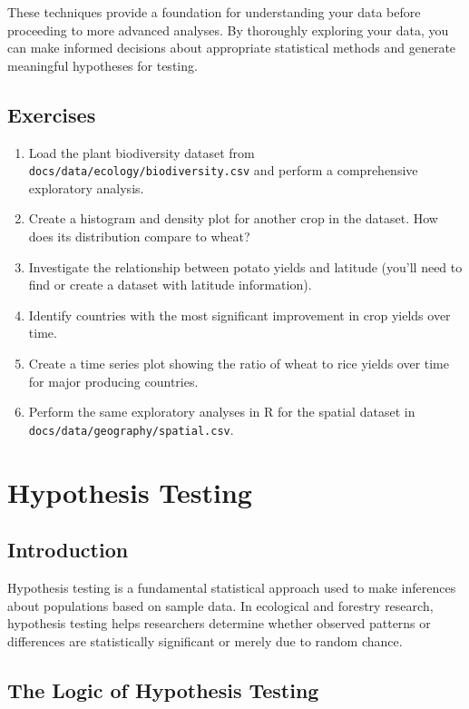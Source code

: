 \documentclass[
  letterpaper,
]{book}
\providecommand{\tightlist}{%
  \setlength{\itemsep}{0pt}\setlength{\parskip}{0pt}}
\begin{document}
These techniques provide a foundation for understanding your data before
proceeding to more advanced analyses. By thoroughly exploring your data,
you can make informed decisions about appropriate statistical methods
and generate meaningful hypotheses for testing.

\section{Exercises}\label{exercises-2}

\begin{enumerate}
\def\labelenumi{\arabic{enumi}.}
\tightlist
\item
  Load the plant biodiversity dataset from
  \texttt{docs/data/ecology/biodiversity.csv} and perform a
  comprehensive exploratory analysis.
\item
  Create a histogram and density plot for another crop in the dataset.
  How does its distribution compare to wheat?
\item
  Investigate the relationship between potato yields and latitude
  (you'll need to find or create a dataset with latitude information).
\item
  Identify countries with the most significant improvement in crop
  yields over time.
\item
  Create a time series plot showing the ratio of wheat to rice yields
  over time for major producing countries.
\item
  Perform the same exploratory analyses in R for the spatial dataset in
  \texttt{docs/data/geography/spatial.csv}.
\end{enumerate}

\chapter{Hypothesis Testing}\label{hypothesis-testing}

\section{Introduction}\label{introduction-2}

Hypothesis testing is a fundamental statistical approach used to make
inferences about populations based on sample data. In ecological and
forestry research, hypothesis testing helps researchers determine
whether observed patterns or differences are statistically significant
or merely due to random chance.

\section{The Logic of Hypothesis
Testing}\label{the-logic-of-hypothesis-testing}
\end{document}
